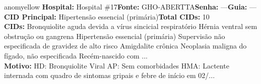 \documentclass[a4paper,10pt]{article}
\begin{document}
\begin{anomalycard}[Interna\c{c}\~{a}o \#7574 | Pac. \#6310 | MODERADO (z=2.12) | LOS: 7d | 06/03/2026\,$\to$\,13/03/2026]{anomyellow}
\textbf{Hospital:} Hospital \#17\quad \textbf{Fonte:} GHO-ABERTTA\quad \textbf{Senha:} ---\quad \textbf{Guia:} ---\\

\textbf{CID Principal:} {\small Hipertensão essencial (primária)}\quad\textbf{Total CIDs:} 10\\

\textbf{CIDs:} {\scriptsize Bronquiolite aguda devida a vírus sincicial respiratório \textbar{} Hérnia ventral sem obstrução ou gangrena \textbar{} Hipertensão essencial (primária) \textbar{} Supervisão não especificada de gravidez de alto risco \textbar{} Amigdalite crônica \textbar{} Neoplasia maligna do fígado, não especificada \textbar{} Recém-nascido com ...}\\

\textbf{Motivo:} {\scriptsize HD: Bronquiolite Viral  AP: Sem comorbidades   HMA: Lactente internada com quadro de sintomas gripais e febre de início em 02/...}\\

\end{anomalycard}
\end{document}
